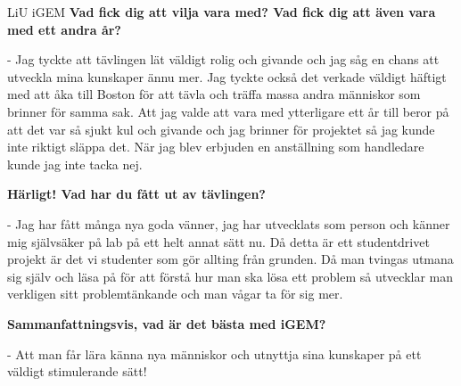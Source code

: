 \begin{news}{3}{LiU iGEM}{}{}{}{}
  \textbf{Vad fick dig att vilja vara med? Vad fick dig att även vara
    med ett andra år?}

  - Jag tyckte att tävlingen lät väldigt rolig och
  givande och jag såg en chans att utveckla mina kunskaper ännu
  mer. Jag tyckte också det verkade väldigt häftigt med att åka till
  Boston för att tävla och träffa massa andra människor som brinner
  för samma sak. Att jag valde att vara med ytterligare ett år till
  beror på att det var så sjukt kul och givande och jag brinner för
  projektet så jag kunde inte riktigt släppa det. När jag blev
  erbjuden en anställning som handledare kunde jag inte tacka nej.

  \textbf{Härligt! Vad har du fått ut av tävlingen?}

  - Jag har fått många
  nya goda vänner, jag har utvecklats som person och känner mig
  självsäker på lab på ett helt annat sätt nu. Då detta är ett
  studentdrivet projekt är det vi studenter som gör allting från
  grunden. Då man tvingas utmana sig själv och läsa på för att förstå
  hur man ska lösa ett problem så utvecklar man verkligen sitt
  problemtänkande och man vågar ta för sig mer.


  \textbf{Sammanfattningsvis, vad är det bästa med iGEM?}

  - Att man får
  lära känna nya människor och utnyttja sina kunskaper på ett väldigt
  stimulerande sätt!
\end{news}


%
%
%
%
